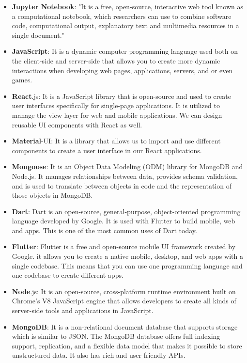 \begin{itemize}
        \item \textbf{Jupyter Notebook}: "It is a free, open-source, interactive web tool known as a computational notebook, which researchers can use to combine software code, computational output, explanatory text and multimedia resources in a single document." ~\cite{25}
        \item \textbf{JavaScript}: It is a dynamic computer programming language used both on the client-side and server-side that allows you to create more dynamic interactions when developing web pages, applications, servers, and or even games. ~\cite{26}  
        \item \textbf{React}.js: It is a JavaScript library that is open-source and used to create user interfaces specifically for single-page applications. It is utilized to manage the view layer for web and mobile applications. We can design reusable UI components with React as well. ~\cite{27}
        \item \textbf{Material}-UI: It is a library that allows us to import and use different components to create a user interface in our React applications. ~\cite{277}
        \item \textbf{Mongoose}: It is an Object Data Modeling (ODM) library for MongoDB and Node.js. It manages relationships between data, provides schema validation, and is used to translate between objects in code and the representation of those objects in MongoDB.
        \item \textbf{Dart}: Dart is an open-source, general-purpose, object-oriented programming language developed by Google. It is used with Flutter to build mobile, web and  apps. This is one of the most common uses of Dart today. ~\cite{28}        
        \item \textbf{Flutter}: Flutter is a free and open-source mobile UI framework created by Google. it allows you to create a native mobile, desktop, and web apps with a single codebase. This means that you can use one programming language and one codebase to create different apps. ~\cite{29}
        \item \textbf{Node}.js: It is an open-source, cross-platform runtime environment built on Chrome's V8 JavaScript engine that allows developers to create all kinds of server-side tools and applications in JavaScript. ~\cite{30}
        \item \textbf{MongoDB}: It is a non-relational document database that supports storage which is similar to JSON. The MongoDB database offers full indexing support, replication, and a flexible data model that makes it possible to store unstructured data. It also has rich and user-friendly APIs. ~\cite{31}

\end{itemize}

